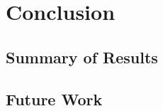 \chapter[Conclusion]{Conclusion}
\label{ch:conclusion}

\section{Summary of Results} \label{sec:summary}

\section{Future Work} \label{sec:future-work}